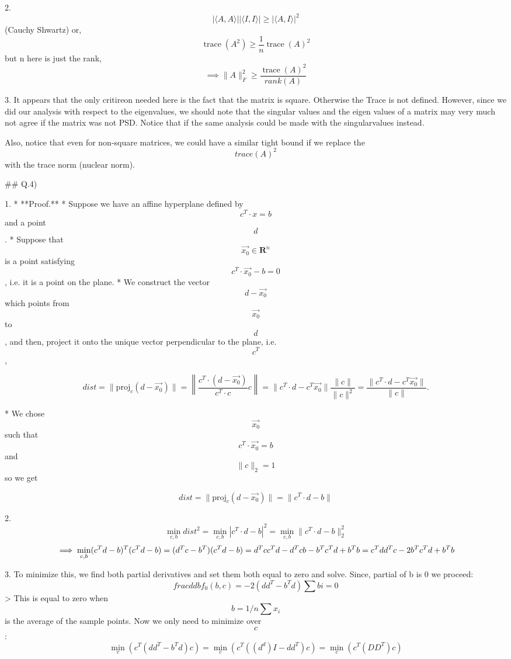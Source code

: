 2.  
    $$
    |\langle A,A\rangle| |\langle I,I\rangle| \ge |\langle A,I\rangle|^2$$ (Cauchy Shwartz) or,  
    $$\operatorname{trace}(A^2)\ge\frac{1}{n}\operatorname{trace}(A)^2$$ but n here is just the rank,  
    $$\implies\|A\|_F^2\ge\frac{\operatorname{trace}(A)^2}{rank(A)}$$

3. It appears that the only critireon needed here is the fact that the matrix is square. Otherwise the Trace is not defined. 
    However, since we did our analysis with respect to the eigenvalues, we should note that the singular values and the eigen values of a matrix may very much not agree if the matrix was not PSD.
    Notice that if the same analysis could be made with the singularvalues instead.  

    Also, notice that even for non-square matrices, we could have a similar tight bound if we replace the $$trace(A)^2$$ with the trace norm (nuclear norm).


## Q.4)

1. 
    * **Proof.**  
        * Suppose we have an affine hyperplane defined by $$c^T \cdot x = b$$ and a point $$d$$.
        * Suppose that $$\vec{x_0} \in \mathbf{R}^n$$ is a point satisfying $$c^T \cdot \vec{x_0} - b = 0$$, i.e. it is a point on the plane.
        * We construct the vector $$d−\vec{x_0}$$ which points from $$\vec{x_0}$$ to $$d$$, and then, project it onto the unique vector perpendicular to the plane, i.e. $$c^T$$,  

            $$dist=\| \text{proj}_{c} (d-\vec{x_0})\| = \left\| \frac{c^T\cdot(d-\vec{x_0}) }{c^T \cdot c} c \right\| = \|c^T \cdot d - c^T\vec{x_0}\|\frac{\|c\|}{\|c\|^2} = \frac{\|c^T \cdot d - c^T\vec{x_0}\|}{\|c\|}.$$

        * We chose $$\vec{x_0}$$ such that $$c^T\cdot \vec{x_0} = b$$ and $$\|c\|_2=1$$ so we get  

            $$dist=\| \text{proj}_{c} (d-\vec{x_0})\| = \|c^T \cdot d - b\|$$

2. 
    $$\min_{c,b} dist^2 = \min_{c,b} |c^T \cdot d - b|^2 = \min_{c,b} \|c^T \cdot d - b\|_2^2$$
    $$\implies \min_{c,b} (c^Td-b)^T(c^Td-b) = (d^Tc-b^T)(c^Td-b)=d^Tcc^Td-d^Tcb-b^Tc^Td+b^Tb \\= c^Tdd^Tc-2b^Tc^Td+b^Tb$$

3. To minimize this, we find both partial derivatives and set them both equal to zero and solve.
    Since, partial of b is 0 we proceed:  
    $$frac{d}{db} f_0(b,c) = -2 (dd^T-b^Td) \sum bi = 0$$  
    > This is equal to zero when $$b = 1/n \sum x_i$$ is the average of the sample points.  
    Now we only need to minimize over $$c$$:  
    $$\min_c (c^T(dd^T-b^Td)c) = \min_c (c^T((d^d)I-dd^T)c) = \min_c (c^T(DD^T)c)$$  

